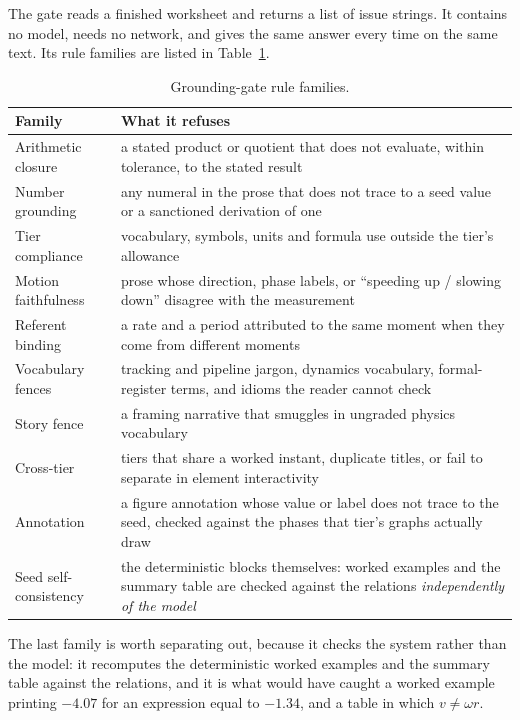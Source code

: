 \documentclass[conference]{IEEEtran}
\begin{document}
The gate reads a finished worksheet and returns a list of issue strings. It
contains no model, needs no network, and gives the same answer every time on
the same text. Its rule families are listed in Table~\ref{tab:gate}.

\begin{table}[t]
\caption{Grounding-gate rule families.}
\label{tab:gate}
\centering
\footnotesize
\begin{tabular}{@{}p{}p{}@{}}
\toprule
\textbf{Family} & \textbf{What it refuses} \\
\midrule
Arithmetic closure & a stated product or quotient that does not evaluate, within tolerance, to the stated result \\
Number grounding & any numeral in the prose that does not trace to a seed value or a sanctioned derivation of one \\
Tier compliance & vocabulary, symbols, units and formula use outside the tier's allowance \\
Motion faithfulness & prose whose direction, phase labels, or ``speeding up / slowing down'' disagree with the measurement \\
Referent binding & a rate and a period attributed to the same moment when they come from different moments \\
Vocabulary fences & tracking and pipeline jargon, dynamics vocabulary, formal-register terms, and idioms the reader cannot check \\
Story fence & a framing narrative that smuggles in ungraded physics vocabulary \\
Cross-tier & tiers that share a worked instant, duplicate titles, or fail to separate in element interactivity \\
Annotation & a figure annotation whose value or label does not trace to the seed, checked against the phases that tier's graphs actually draw \\
Seed self-consistency & the deterministic blocks themselves: worked examples and the summary table are checked against the relations \emph{independently of the model} \\
\bottomrule
\end{tabular}
\end{table}

The last family is worth separating out, because it checks the system rather
than the model: it recomputes the deterministic worked examples and the summary
table against the relations, and it is what would have caught a worked example
printing $-4.07$ for an expression equal to $-1.34$, and a table in which
$v \neq \omega r$.
\end{document}
